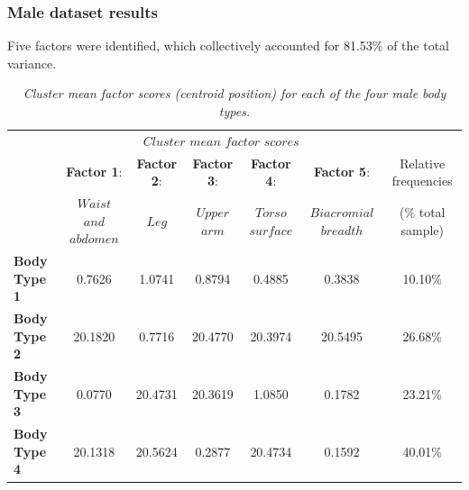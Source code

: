 \documentclass[12pt,a4paper,openany,UKenglish]{scrreprt}
\begin{document}
\subsubsection{Male dataset results}
Five factors were identified, which collectively accounted for 81.53\% of the total variance.
\begin{table}[H]
	\centering
	\caption{\footnotesize\centering\itshape Cluster mean factor scores (centroid position) for each of the four male body types.}
	{\sffamily\scriptsize
		\begin{tabular}{lcccccc}
			\hline
			                     & \multicolumn{5}{c}{$Cluster$ $mean$ $factor$ $scores$}                                                                                                                \\
			\cline{2-6}
			                     & \textbf{Factor 1}:                                     & \textbf{Factor 2}: & \textbf{Factor 3}: & \textbf{Factor 4}: & \textbf{Factor 5}:     & Relative frequencies \\
			                     & $Waist$ $and$ $abdomen$                                & $Leg$              & $Upper$ $arm$      & $Torso$ $surface$  & $Biacromial$ $breadth$ & (\% total sample)    \\
			\hline
			\textbf{Body Type 1} & 0.7626                                                 & 1.0741             & 0.8794             & 0.4885             & 0.3838                 & 10.10\%              \\
			\textbf{Body Type 2} & 20.1820                                                & 0.7716             & 20.4770            & 20.3974            & 20.5495                & 26.68\%              \\
			\textbf{Body Type 3} & 0.0770                                                 & 20.4731            & 20.3619            & 1.0850             & 0.1782                 & 23.21\%              \\
			\textbf{Body Type 4} & 20.1318                                                & 20.5624            & 0.2877             & 20.4734            & 0.1592                 & 40.01\%              \\
			\hline
		\end{tabular}
	}
\end{table}
\end{document}
